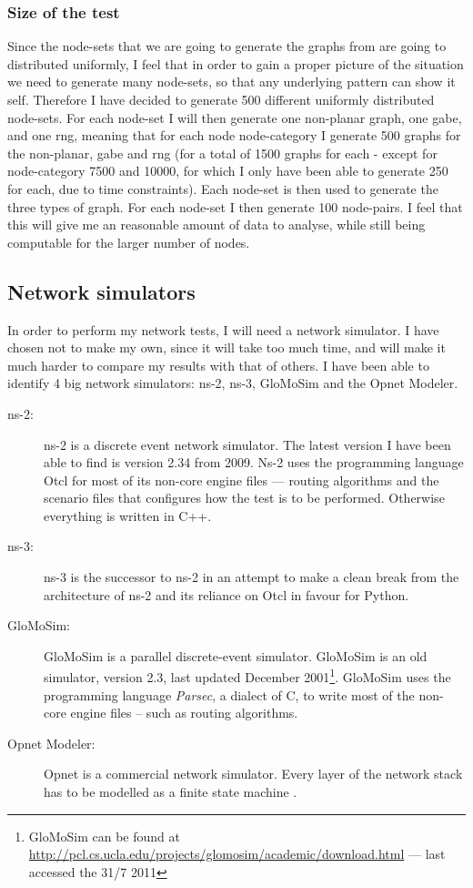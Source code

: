 \subsubsection{Size of the test}
Since the node-sets that we are going to generate the graphs from are going to distributed uniformly, I feel that in order to gain a proper picture of the situation we need to generate many node-sets, so that any underlying pattern can show it self. Therefore I have decided to generate 500 different uniformly distributed node-sets. For each node-set I will then generate one non-planar graph, one \ac{gabe}, and one \ac{rng}, meaning that for each node node-category I  generate 500 graphs for the non-planar, \ac{gabe} and \ac{rng} (for a total of 1500 graphs for each - except for node-category 7500 and 10000, for which I only have been able to generate 250 for each, due to time constraints). Each node-set is then used to generate the three types of graph. For each node-set I then generate 100 node-pairs. I feel that this will give me an reasonable amount of data to analyse, while still being computable for the larger number of nodes.

\subsection{Network simulators}
\label{section:network_simulators}

In order to perform my network tests, I will need a network simulator. I have chosen not to make my own, since it will take too much time, and will make it much harder to compare my results with that of others. I have been able to identify 4 big network simulators: ns-2, ns-3, GloMoSim and the Opnet Modeler.

\begin{description}
\item[ns-2:] ns-2 is a discrete event network simulator. The latest version I have been able to find is version 2.34 from 2009. Ns-2 uses the programming language Otcl for most of its non-core engine files --- routing algorithms and the scenario files that configures how the test is to be performed. Otherwise everything is written in C++.
\item[ns-3:] ns-3 is the successor to ns-2 in an attempt to make a clean break from the architecture of ns-2 and its reliance on Otcl in favour for Python.
\item[GloMoSim:] GloMoSim is a parallel discrete-event simulator. GloMoSim is an old simulator, version 2.3, last updated December 2001\footnote{GloMoSim can be found at \url{http://pcl.cs.ucla.edu/projects/glomosim/academic/download.html} --- last accessed the 31/7 2011}. GloMoSim uses the programming language \emph{Parsec}, a dialect of C, to write most of the non-core engine files -- such as routing algorithms. 
\item[Opnet Modeler:] Opnet is a commercial network simulator. Every layer of the network stack has to be modelled as a finite state machine \cite{MANcom}. 
\end{description}

